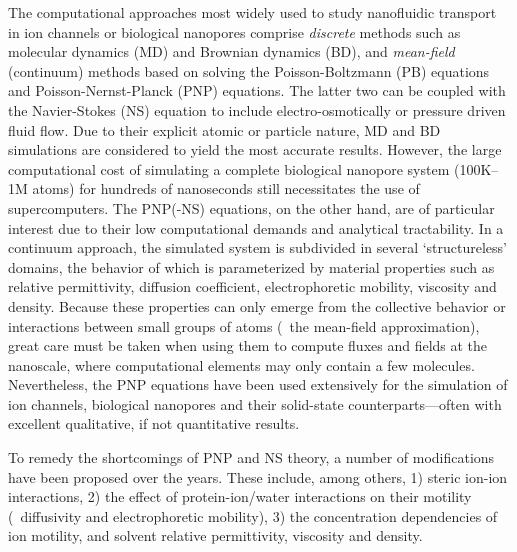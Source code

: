 \documentclass[journal=ancac3,manuscript=article,etalmode=truncate,maxauthors=0,layout=onecolumn]{achemso}
\begin{document}
The computational approaches most widely used to study nanofluidic transport in ion channels or biological
nanopores comprise \emph{discrete} methods such as molecular dynamics
(MD)\cite{Lynden-Bell-1996,Allen-1999,Aksimentiev-2005,Luan-2008,Bhattacharya-2011,Zhang-2014,DiMarino-2015,Belkin-2016}
and Brownian dynamics
(BD),\cite{Schirmer-1999,Im-2002,Noskov-2004,Millar-2008,Egwolf-2010,DeBiase-2015,Pederson-2015} and
\emph{mean-field} (continuum) methods based on solving the Poisson-Boltzmann (PB)
equations\cite{Grochowski-2008, Baldessari-2008-1} and Poisson-Nernst-Planck (PNP)
equations.\cite{Eisenberg-1996,Gillespie-2002, Simakov-2010} The latter two can be coupled with the
Navier-Stokes (NS) equation to include electro-osmotically or pressure driven fluid
flow.\cite{Lu-2012,Pederson-2015} Due to their explicit atomic or particle nature, MD and BD simulations are
considered to yield the most accurate results. However, the large computational cost of simulating a complete
biological nanopore system (100K--1M atoms) for hundreds of nanoseconds still necessitates the use of
supercomputers.\cite{Aksimentiev-2005,Bhattacharya-2011} The PNP(-NS) equations, on the other hand, are of
particular interest due to their low computational demands and analytical tractability. In a continuum
approach, the simulated system is subdivided in several `structureless' domains, the behavior of which is
parameterized by material properties such as relative permittivity, diffusion coefficient, electrophoretic
mobility, viscosity and density. Because these properties can only emerge from the collective behavior or
interactions between small groups of atoms (\ie~the mean-field approximation), great care must be taken when
using them to compute fluxes and fields at the nanoscale, where computational elements may only contain a few
molecules.\cite{Corry-2000,Collins-2012} Nevertheless, the PNP equations have been used extensively for the
simulation of ion channels,\cite{Im-2002,Furini-2006,Liu-2015} biological
nanopores\cite{Simakov-2010,Pederson-2015,Aguilella-Arzo-2017,Simakov-2018} and their solid-state
counterparts\cite{Cervera-2005,White-2008,Chaudhry-2014,Laohakunakorn-2015}---often with excellent
qualitative, if not quantitative results.\cite{Maffeo-2012,Thomas-2014,Kim-2015}

To remedy the shortcomings of PNP and NS theory, a number of modifications have been proposed over the years.
These include, among others, 1) steric ion-ion interactions, 2) the effect of protein-ion/water interactions
on their motility (\ie~diffusivity and electrophoretic mobility), 3) the concentration dependencies of ion
motility, and solvent relative permittivity, viscosity and density.
\end{document}
